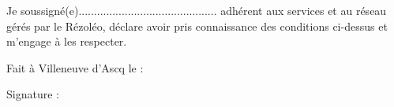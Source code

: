 \documentclass[12pt]{article}
\begin{document}
\vspace*{0.5cm}

Je soussigné(e)............................................. adhérent aux services et au réseau gérés par le Rézoléo,
déclare avoir pris connaissance des conditions ci-dessus et m'engage à les respecter.

\vspace*{0.5cm}

\hspace{2cm} Fait à Villeneuve d'Ascq le : \dotfill


\hspace{2cm} Signature :
\end{document}

